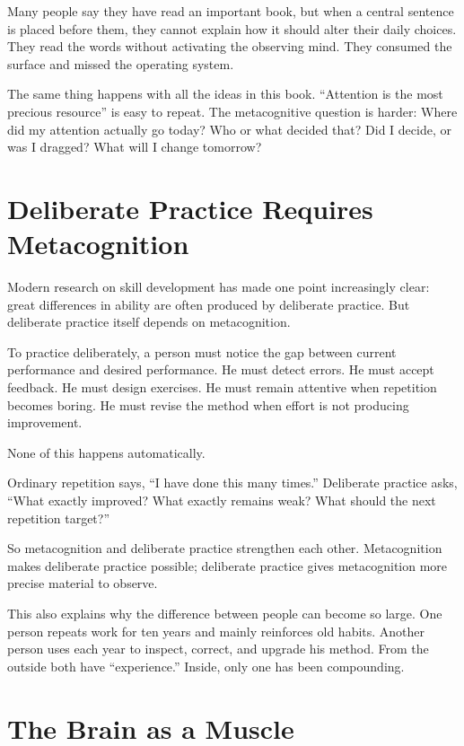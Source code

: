 Many people say they have read an important book, but when a central sentence is placed before them, they cannot explain how it should alter their daily choices. They read the words without activating the observing mind. They consumed the surface and missed the operating system.

The same thing happens with all the ideas in this book. ``Attention is the most precious resource'' is easy to repeat. The metacognitive question is harder: Where did my attention actually go today? Who or what decided that? Did I decide, or was I dragged? What will I change tomorrow?

\section*{Deliberate Practice Requires Metacognition}

Modern research on skill development has made one point increasingly clear: great differences in ability are often produced by deliberate practice. But deliberate practice itself depends on metacognition.

To practice deliberately, a person must notice the gap between current performance and desired performance. He must detect errors. He must accept feedback. He must design exercises. He must remain attentive when repetition becomes boring. He must revise the method when effort is not producing improvement.

None of this happens automatically.

Ordinary repetition says, ``I have done this many times.'' Deliberate practice asks, ``What exactly improved? What exactly remains weak? What should the next repetition target?''

So metacognition and deliberate practice strengthen each other. Metacognition makes deliberate practice possible; deliberate practice gives metacognition more precise material to observe.

This also explains why the difference between people can become so large. One person repeats work for ten years and mainly reinforces old habits. Another person uses each year to inspect, correct, and upgrade his method. From the outside both have ``experience.'' Inside, only one has been compounding.

\section*{The Brain as a Muscle}

